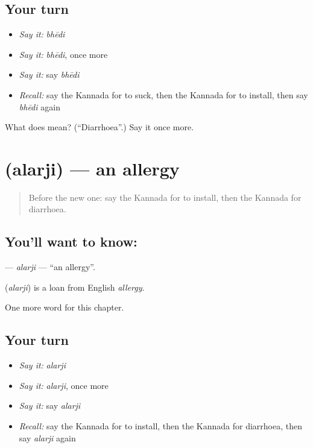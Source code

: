 \subsection*{Your turn}
\begin{itemize}
\raggedright
  \item \emph{Say it:} \emph{bhēdi}
  \item \emph{Say it:} \emph{bhēdi}, once more
  \item \emph{Say it:} say \emph{bhēdi}
  \item \emph{Recall:} say the Kannada for to suck, then the Kannada for to install, then say \emph{bhēdi} again
\end{itemize}

\begin{tcolorbox}[breakable,colback=teal!4,colframe=teal!35!black,title={Before you move on}]
What does  mean? (\textquotedblleft{}Diarrhoea\textquotedblright{}.) Say it once more.
\end{tcolorbox}
\section[\texorpdfstring{\kn{ಅಲರ್ಜಿ} (alarji)}{ಅಲರ್ಜಿ (alarji)}]{ (alarji) — an allergy}

\label{lesson:KA-C245-alarji}



\begin{quote}
Before the new one: say the Kannada for to install, then the Kannada for diarrhoea.
\end{quote}

\subsection*{You'll want to know: }
\textbf{} — \emph{alarji} — \textquotedblleft{}an allergy\textquotedblright{}.

\begin{cousinweb}
\textbf{} (\emph{alarji}) is a loan from English \emph{allergy}.
\end{cousinweb}

\begin{grammarlens}[title={What you've built}]
One more word for this chapter.
\end{grammarlens}

\subsection*{Your turn}
\begin{itemize}
\raggedright
  \item \emph{Say it:} \emph{alarji}
  \item \emph{Say it:} \emph{alarji}, once more
  \item \emph{Say it:} say \emph{alarji}
  \item \emph{Recall:} say the Kannada for to install, then the Kannada for diarrhoea, then say \emph{alarji} again
\end{itemize}


